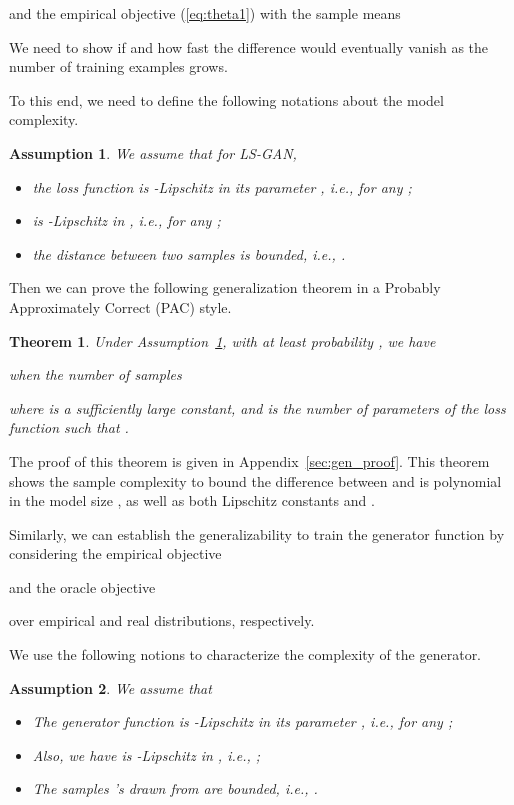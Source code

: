 \documentclass[11pt,fullpage, letterpaper,twoside]{article}
\newtheorem{theorem}{Theorem}
\newtheorem{assumption}{Assumption}
\newcommand{\1}[1]{\mathds{1}_{\left[#1\right]}}
\begin{document}
and the empirical objective (\ref{eq:theta1}) with the sample means



We need to show if and how fast the difference  would eventually vanish as the number  of training examples grows.


To this end, we need to define the following notations about the model complexity.
\begin{assumption}\label{asp:loss}
We assume that for LS-GAN,
\begin{itemize}
\item[I.] the loss function  is -Lipschitz in its parameter , i.e.,  for any ;
\item[II.]  is -Lipschitz in , i.e.,  for any ;
\item[III.] the distance between two samples is bounded, i.e., .
\end{itemize}
\end{assumption}

Then we can prove the following generalization theorem in a Probably Approximately Correct (PAC) style.
\begin{theorem}\label{thm:generalization}
Under Assumption~\ref{asp:loss}, with at least probability , we have

when the number of samples

where  is a sufficiently large constant, and  is the number of parameters of the loss function such that .
\end{theorem}
The proof of this theorem is given in Appendix~\ref{sec:gen_proof}. This theorem shows the sample complexity to bound the difference between  and  is polynomial in the model size , as well as both Lipschitz constants  and .




Similarly, we can establish the generalizability to train the generator function by considering the empirical objective

and the oracle objective

over empirical and real distributions, respectively.

We use the following notions to characterize the complexity of the generator.
\begin{assumption}\label{asp:generator}
We assume that
\begin{itemize}
\item[I.] The generator function  is -Lipschitz in its parameter , i.e.,  for any ;
\item[II.] Also, we have  is -Lipschitz in , i.e., ;
\item[III.] The samples 's drawn from  are bounded, i.e., .
\end{itemize}
\end{assumption}
\end{document}
